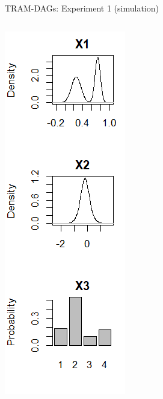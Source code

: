 \documentclass[onlytextwidth,english]{beamer}\usepackage[]{graphicx}\usepackage[]{xcolor}
\begin{document}
\begin{frame}{TRAM-DAGs: Experiment 1 (simulation)}
\begin{columns}
\begin{column}{0.28\textwidth}
\includegraphics[width=0.8\linewidth]{img/DGP_Variables.png}
\end{column}

\end{columns}

\end{frame}
\end{document}
